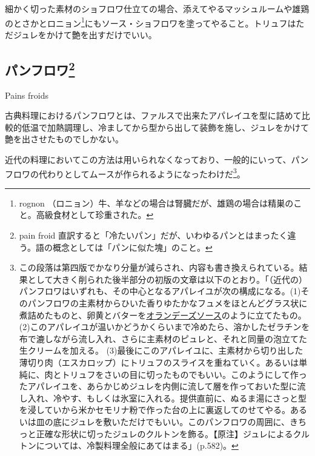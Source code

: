 \begin{main}
細かく切った素材のショフロワ仕立ての場合、添えてやるマッシュルームや雄鶏のとさかとロニョン\footnote{rognon
  （ロニョン）牛、羊などの場合は腎臓だが、雄鶏の場合は精巣のこと。高級食材として珍重された。}にもソース・ショフロワを塗ってやること。トリュフはただジュレをかけて艶を出すだけでいい。

\hypertarget{pains-froids}{%
\subsection[パンフロワ]{\texorpdfstring{パンフロワ\footnote{pain froid
  直訳すると「冷たいパン」だが、いわゆるパンとはまったく違う。語の概念としては「パンに似た塊」のこと。}}{パンフロワ}}\label{pains-froids}}

\begin{frsecbenv}

Pains froids

\end{frsecbenv}


古典料理におけるパンフロワとは、ファルスで出来たアパレイユを型に詰めて比較的低温で加熱調理し、冷ましてから型から出して装飾を施し、ジュレをかけて艶を出させたものでしかない。

近代の料理においてこの方法は用いられなくなっており、一般的にいって、パンフロワの代わりとしてムースが作られるようになったわけだ\footnote{この段落は第四版でかなり分量が減らされ、内容も書き換えられている。結果として大きく削られた後半部分の初版の文章は以下のとおり。「（近代の）パンフロワはいずれも、その中心となるアパレイユが次の構成になる。(1)そのパンフロワの主素材からひいた香りゆたかなフュメをほとんどグラス状に煮詰めたものと、卵黄とバターを\protect\hyperlink{sauce-hollandaise}{オランデーズソース}のように立てたもの。(2)このアパレイユが温いかどうかくらいまで冷めたら、溶かしたゼラチンを布で漉しながら流し入れ、さらに主素材のピュレと、それと同量の泡立てた生クリームを加える。
  (3)最後にこのアパレイユに、主素材から切り出した薄切り肉（エスカロップ）にトリュフのスライスを重ねていく。あるいは単純に、肉とトリュフをさいの目に切ったものでもいい。このようにして作ったアパレイユを、あらかじめジュレを内側に流して層を作っておいた型に流し入れ、冷やす、もしくは氷室に入れる。提供直前に、ぬるま湯にさっと型を浸していから米かセモリナ粉で作った台の上に裏返してのせてやる。あるいは皿の底にジュレを敷いただけでもいい。このパンフロワの周囲に、きちっと正確な形状に切ったジュレのクルトンを飾る。【原注】ジュレによるクルトンについては、冷製料理全般にあてはまる」(p.582)。}。


\end{main}
